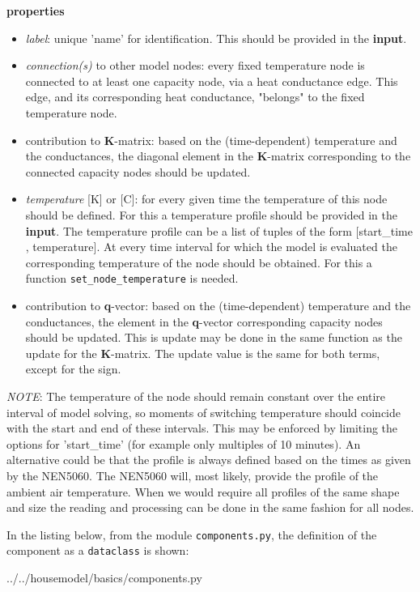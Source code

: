 \textbf{properties}
\begin{itemize}
	\item \emph{label}: unique 'name' for identification. This should be provided in the \textbf{input}.
	\item \emph{connection(s)} to other model nodes: every fixed temperature node is connected to at least one capacity node, via a heat conductance edge. This edge, and its corresponding heat conductance, "belongs" to the fixed temperature node.
	\item contribution to \textbf{K}-matrix: based on the (time-dependent) temperature and the conductances, the diagonal element in the \textbf{K}-matrix corresponding to the connected capacity nodes should be updated.
	\item \emph{temperature} [K] or [\degree C]: for every given time the temperature of this node should be defined. For this a temperature profile should be provided in the \textbf{input}. The temperature profile can be a list of tuples of the form [start\_time , temperature]. At every time interval for which the model is evaluated the corresponding temperature of the node should be obtained. For this a function \texttt{set\_node\_temperature} is needed. 
	\item contribution to \textbf{q}-vector: based on the (time-dependent) temperature and the conductances, the element in the \textbf{q}-vector corresponding capacity nodes should be updated. This is update may be done in the same function as the update for the \textbf{K}-matrix. The update value is the same for both terms, except for the sign. 
\end{itemize}
\emph{NOTE}: The temperature of the node should remain constant over the entire interval of model solving, so moments of switching temperature should coincide with the start and end of these intervals. This may be enforced by limiting the options for 'start\_time' (for example only multiples of 10 minutes). An alternative could be that the profile is always defined based on the times as given by the NEN5060. The NEN5060 will, most likely, provide the profile of the ambient air temperature. When we would require all profiles of the same shape and size the reading and processing can be done in the same fashion for all nodes. 

In the listing below, from the module \texttt{components.py}, the definition of the component as a \texttt{dataclass} is shown:
\begin{minipage}{\linewidth}
 
{../../housemodel/basics/components.py}
\end{minipage}

